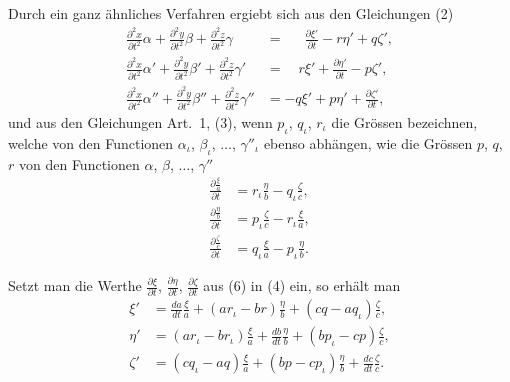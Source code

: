 \documentclass[12pt,a4paper]{article}
\begin{document}
Durch ein ganz ähnliches Verfahren ergiebt sich aus den Gleichungen (2)
\begin{equation}
\tag{5}
\begin{aligned}
\frac{\partial^2 x}{\partial t^2}\alpha + \frac{\partial^2 y}{\partial t^2}\beta + \frac{\partial^2 z}{\partial t^2}\gamma &= \quad\ \ \frac{\partial \xi'}{\partial t} - r\eta' + q\zeta',\\
\frac{\partial^2 x}{\partial t^2}\alpha' + \frac{\partial^2 y}{\partial t^2}\beta' + \frac{\partial^2 z}{\partial t^2}\gamma' &= \quad r\xi' + \frac{\partial \eta'}{\partial t} - p\zeta',\\
\frac{\partial^2 x}{\partial t^2}\alpha'' + \frac{\partial^2 y}{\partial t^2}\beta'' + \frac{\partial^2 z}{\partial t^2}\gamma'' &= -q\xi' + p\eta' + \frac{\partial \zeta'}{\partial t},
\end{aligned}
\end{equation}
und aus den Gleichungen Art.~1, (3), wenn $p_\iota$, $q_\iota$, $r_\iota$ die Grössen bezeichnen, welche von den Functionen $\alpha_\iota$, $\beta_\iota$, $\ldots$, $\gamma''_{\iota}$ ebenso abhängen, wie die Grössen $p$, $q$, $r$ von den Functionen $\alpha$, $\beta$, $\ldots$, $\gamma''$
\begin{equation}
\tag{6}
\begin{aligned}
\frac{\partial \frac{\xi}{a}}{\partial t} &= r_\iota\frac{\eta}{b} - q_\iota\frac{\zeta}{c},\\
\frac{\partial \frac{\eta}{b}}{\partial t} &= p_\iota\frac{\zeta}{c} - r_\iota\frac{\xi}{a},\\
\frac{\partial \frac{\zeta}{c}}{\partial t} &= q_\iota\frac{\xi}{a} - p_\iota\frac{\eta}{b}.
\end{aligned}
\end{equation}

Setzt man die Werthe $\frac{\partial \xi}{\partial t}$, $\frac{\partial \eta}{\partial t}$, $\frac{\partial \zeta}{\partial t}$ aus (6) in (4) ein, so erhält man
\begin{equation}
\tag{7}
\begin{aligned}
\xi' &= \frac{da}{dt}\frac{\xi}{a} + (ar_\iota - br)\frac{\eta}{b} + (cq - aq_\iota)\frac{\zeta}{c},\\
\eta' &= (ar_\iota - br_\iota)\frac{\xi}{a} + \frac{db}{dt}\frac{\eta}{b} + (bp_\iota - cp)\frac{\zeta}{c},\\
\zeta' &= (cq_\iota - aq)\frac{\xi}{a} + (bp - cp_\iota)\frac{\eta}{b} + \frac{dc}{dt}\frac{\zeta}{c}.
\end{aligned}
\end{equation}
\end{document}
